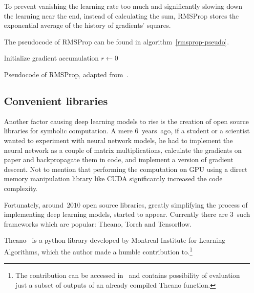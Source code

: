 To prevent vanishing the learning rate too much and significantly slowing down the learning near the end, instead of calculating the sum, RMSProp stores the exponential average of the history of gradients' squares.

The pseudocode of RMSProp can be found in algorithm~\ref{rmsprop-pseudo}.
\begin{algorithm}
  \DontPrintSemicolon
  Initialize gradient accumulation $r \leftarrow 0$\;
  \caption{Pseudocode of RMSProp, adapted from~\cite[Chapter 8.5.2]{dlbook}.}\label{rmsprop-pseudo}
\end{algorithm}

\subsection{Convenient libraries}
Another factor causing deep learning models to rise is the creation of open source libraries for symbolic computation. A mere $6$~years~ago, if a student or a scientist wanted to experiment with neural network models, he had to implement the neural network as a couple of matrix multiplications, calculate the gradients on paper and backpropagate them in code, and implement a version of gradient descent. Not to mention that performing the computation on GPU using a direct memory manipulation library like CUDA significantly increased the code complexity.

Fortunately, around~$2010$ open source libraries, greatly simplifying the process of implementing deep learning models, started to appear. Currently there are $3$~such frameworks which are popular: Theano, Torch and Tensorflow.

Theano~\cite{theano} is a python library developed by Montreal Institute for Learning Algorithms, which the author made a humble contribution to.\footnote{The contribution can be accessed in~\cite{theano-contrib} and contains possibility of evaluation just a subset of outputs of an already compiled Theano function.}


